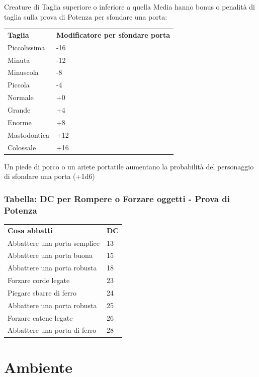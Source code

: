 \documentclass[a4paper,11pt,twoside,openany]{book}
\begin{document}
Creature di Taglia superiore o inferiore a quella Media hanno bonus o penalità di taglia sulla prova di Potenza per sfondare una porta:

\bigskip

\begin{tabular}{ll}
	\toprule
	\textbf{Taglia} & \textbf{Modificatore per sfondare porta}\\
	Piccolissima    & -16\\
	Minuta          & -12\\
	Minuscola       & -8\\
	Piccola         & -4\\
	Normale         & +0\\
	Grande          & +4\\
	Enorme          & +8\\
	Mastodontica    & +12\\
	Colossale       & +16\\
\end{tabular}

\bigskip

Un piede di porco o un ariete portatile aumentano la probabilità del personaggio di sfondare una porta (+1d6)

\subsubsection{Tabella: DC per Rompere o Forzare oggetti - Prova di Potenza}

\label{tabella-dc-per-rompere-o-forzare-oggetti---prova-di-potenza}
\bigskip

\begin{tabular}{ll}
	\toprule
	\textbf{Cosa abbatti}        & \textbf{DC}\\
	Abbattere una porta semplice & 13\\
	Abbattere una porta buona    & 15\\
	Abbattere una porta robusta  & 18\\
	Forzare corde legate         & 23\\
	Piegare sbarre di ferro      & 24\\
	Abbattere una porta robusta  & 25\\
	Forzare catene legate        & 26\\
	Abbattere una porta di ferro & 28\\
\end{tabular}
\bigskip

\pagebreak

\section{Ambiente}
\end{document}

